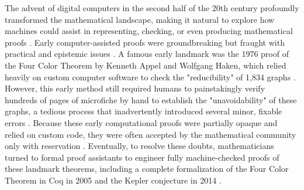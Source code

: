 The advent of digital computers in the second half of the 20th century profoundly transformed the mathematical landscape, making it natural to explore how machines could assist in representing, checking, or even producing mathematical proofs \cite{asperti_thinking_2026}. Early computer-assisted proofs were groundbreaking but fraught with practical and epistemic issues \cite{tao_machine-assisted_2025}. A famous early landmark was the 1976 proof of the Four Color Theorem by Kenneth Appel and Wolfgang Haken, which relied heavily on custom computer software to check the "reducibility" of 1,834 graphs \cite{tao_machine-assisted_2025}. However, this early method still required humans to painstakingly verify hundreds of pages of microfiche by hand to establish the "unavoidability" of these graphs, a tedious process that inadvertently introduced several minor, fixable errors \cite{tao_machine-assisted_2025}. Because these early computational proofs were partially opaque and relied on custom code, they were often accepted by the mathematical community only with reservation \cite{de_toffoli_proofs_2024}. Eventually, to resolve these doubts, mathematicians turned to formal proof assistants to engineer fully machine-checked proofs of these landmark theorems, including a complete formalization of the Four Color Theorem in Coq in 2005 and the Kepler conjecture in 2014 \cite{de_toffoli_proofs_2024, tao_machine-assisted_2025}.

